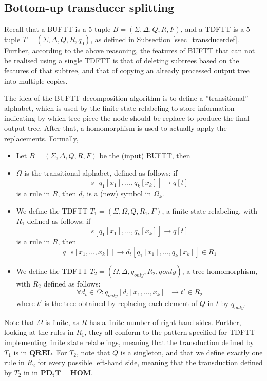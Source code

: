 \subsection{Bottom-up transducer splitting}

Recall that a BUFTT is a 5-tuple $B = (\Sigma, \Delta, Q, R, F)$, and
a TDFTT is a 5-tuple $T = (\Sigma, \Delta, Q, R, q_0)$,
as defined in Subsection \ref{ssec_transducerdef}. Further, according to
the above reasoning, the features of BUFTT that can not be realised using a
single TDFTT is that of deleting subtrees based on the features of that
subtree, and that of copying an already processed output tree into multiple
copies.

The idea of the BUFTT decomposition algorithm is to define a
''transitional'' alphabet, which is used by the finite state relabeling to
store information indicating by which tree-piece the node should be replace
to produce the final output tree. After that, a homomorphism is used to
actually apply the replacements. Formally,

\begin{itemize}
\item Let $B = (\Sigma, \Delta, Q, R, F)$ be the (input) BUFTT, then

\item $\Omega$ is the transitional alphabet, defined as follows: if 
$$s[q_1[x_1],\ldots,q_k[x_k]] \rightarrow q[t]$$ is a rule in $R$, then
$d_{t}$ is a (new) symbol in $\Omega_k$.

\item We define the TDFTT $T_1 = (\Sigma, \Omega, Q, R_1, F)$, a
finite state relabeling, with $R_1$ defined as follows: if 
$$s[q_1[x_1],\ldots,q_k[x_k]] \rightarrow q[t]$$ is a rule in $R$, then
$$q[s[x_1,\ldots,x_k]] \rightarrow d_{t}[q_1[x_1],\ldots,q_k[x_k]] \in R_1$$

\item We define the TDFTT $T_2 = (\Omega, \Delta, {q_{only}}, R_2, {q_{}only})$, a tree
homomorphism, with $R_2$ defined as follows: $$\forall d_t \in \Omega:
q_{only}[d_t[x_1,\ldots,x_k]] \rightarrow t' \in R_2$$ where $t'$ is the tree obtained by
replacing each element of $Q$ in $t$ by $q_{only}$.
\end{itemize}

Note that $\Omega$ is finite, as $R$ has a finite number of right-hand
sides. Further, looking at the rules in $R_1$, they all conform to the
pattern specified for TDFTT implementing finite state relabelings, meaning
that the transduction defined by $T_1$ is in $\mathbf{QREL}$. For $T_2$,
note that $Q$ is a singleton, and that we define exactly one rule in $R_2$
for every possible left-hand side, meaning that the transduction defined by
$T_2$ in in $\mathbf{PD_tT = HOM}$.

